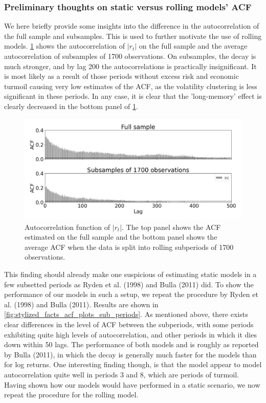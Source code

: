\subsubsection{Preliminary thoughts on static versus rolling models' ACF}

We here briefly provide some insights into the difference in the autocorrelation of the full sample and subsamples. This is used to further motivate the use of rolling models.
\cref{fig:stylized_facts_acf_data} shows the autocorrelation of $|r_t|$ on the full sample and the average autocorrelation of subsamples of 1700 observations. On subsamples, the decay is much stronger, and by lag 200 the autocorrelations is practically insignificant. It is most likely as a result of those periods without excess risk and economic turmoil causing very low estimates of the ACF, as the volatility clustering is less significant in these periods. In any case, it is clear that the 'long-memory' effect is clearly decreased in the bottom panel of \cref{fig:stylized_facts_acf_data}.

\begin{figure}[H] 
    \centering
    \includegraphics[width=1.0\textwidth]{analysis/stylized_facts/images/acf_data.png}
    \caption[Autocorrelation function of $|r_t|$ on full sample and subsamples]{Autocorrelation function of $|r_t|$. The top panel shows the ACF estimated on the full sample and the bottom panel shows the average ACF when the data is split into rolling subperiods of 1700 observations.}
    \label{fig:stylized_facts_acf_data} 
\end{figure}

This finding should already make one suspicious of estimating static models in a few subsetted periods as Ryden et al. (1998) and Bulla (2011) did. To show the performance of our models in such a setup, we repeat the procedure by Ryden et al. (1998) and Bulla (2011). Results are shown in \cref{fig:stylized_facts_acf_plots_sub_periods}. As mentioned above, there exists clear differences in the level of ACF between the subperiods, with some periods exhibiting quite high levels of autocorrelation, and other periods in which it dies down within 50 lags. The performance of both models \mle and \jump is roughly as reported by Bulla (2011), in which the decay is generally much faster for the models than for log returns. One interesting finding though, is that the \mle model appear to model autocorrelation quite well in periods 3 and 8, which are periods of turmoil. Having shown how our models would have performed in a static scenario, we now repeat the procedure for the rolling model.

